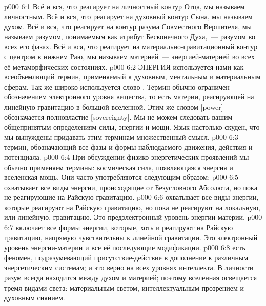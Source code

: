 \vs p000 6:1 Всё и вся, что реагирует на личностный контур Отца, мы называем личностным. Всё и вся, что реагирует на духовный контур Сына, мы называем духом. Всё и вся, что реагирует на контур разума Совместного Вершителя, мы называем разумом, понимаемым как атрибут Бесконечного Духа,~--- разумом во всех его фазах. Всё и вся, что реагирует на материально\hyp{}гравитационный контур с центром в нижнем Раю, мы называем материей~--- энергией\hyp{}материей во всех её метаморфических состояниях.
\vs p000 6:2 \pc ЭНЕРГИЯ используется нами как всеобъемлющий термин, применяемый к духовным, ментальным и материальным сферам. Так же широко используется слово . Термин  обычно ограничен обозначением электронного уровня вещества, то есть материи, реагирующей на линейную гравитацию в большой вселенной. Этим же словом [power] обозначается полновластие [sovereignty]. Мы не можем следовать вашим общепринятым определениям силы, энергии и мощи. Язык настолько скуден, что мы вынуждены придавать этим терминам множественный смысл.
\vs p000 6:3 \pc {}~--- термин, обозначающий все фазы и формы наблюдаемого движения, действия и потенциала.
\vs p000 6:4 При обсуждении физико\hyp{}энергетических проявлений мы обычно применяем термины: космическая сила, появляющаяся энергия и вселенская мощь. Они часто употребляются следующим образом:
\vs p000 6:5  охватывает все виды энергии, происходящие от Безусловного Абсолюта, но пока не реагирующие на Райскую гравитацию.
\vs p000 6:6  охватывает все виды энергии, которые реагируют на Райскую гравитацию, но пока не реагируют на локальную, или линейную, гравитацию. Это предэлектронный уровень энергии\hyp{}материи.
\vs p000 6:7  включает все формы энергии, которые, хоть и реагируют на Райскую гравитацию, напрямую чувствительны к линейной гравитации. Это электронный уровень энергии\hyp{}материи и все её последующие модификации.
\vs p000 6:8 \pc {} есть феномен, подразумевающий присутствие\hyp{}действие  в дополнение к различным энергетическим системам; и это верно на всех уровнях интеллекта. В личности разум всегда находится между духом и материей; поэтому вселенная освещается тремя видами света: материальным светом, интеллектуальным прозрением и духовным сиянием.

